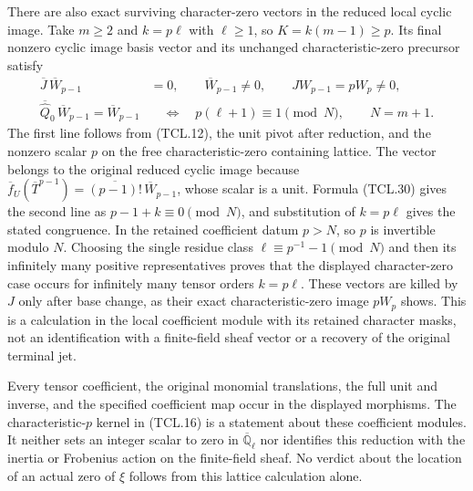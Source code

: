 There are also exact surviving character-zero vectors in the
reduced local cyclic image. Take \(m\geq2\) and \(k=p\ell\) with
\(\ell\geq1\), so \(K=k(m-1)\geq p\). Its final nonzero cyclic
image basis vector and its unchanged characteristic-zero precursor
satisfy
\[
 \begin{split}
 \overline J\,\overline W_{p-1}&=0,\qquad
       \overline W_{p-1}\ne0,\qquad J W_{p-1}=pW_p\ne0,\\
 \overline{\widehat Q}_0\,\overline W_{p-1}=\overline W_{p-1}
       &\quad\Longleftrightarrow\quad
       p(\ell+1)\equiv1\pmod{N},\qquad N=m+1 .
 \end{split}
 \tag{TCL.37}\label{eq:tcl-surviving-character}
\]
The first line follows from (TCL.12), the unit pivot after
reduction, and the nonzero scalar \(p\) on the free
characteristic-zero containing lattice. The vector belongs to
the original reduced cyclic image because
\(\overline f_U(\overline T^{p-1})
 =\overline{(p-1)!}\,\overline W_{p-1}\), whose scalar is a
unit. Formula (TCL.30) gives the second line as
\(p-1+k\equiv0\pmod N\), and substitution of \(k=p\ell\)
gives the stated congruence. In the retained coefficient datum
\(p>N\), so \(p\) is invertible modulo \(N\). Choosing the
single residue class
\(\ell\equiv p^{-1}-1\pmod N\) and then its infinitely many
positive representatives proves that the displayed character-zero
case occurs for infinitely many tensor orders \(k=p\ell\).
These vectors are killed by \(J\) only after base change, as
their exact characteristic-zero image \(pW_p\) shows. This is
a calculation in the local coefficient module with its retained
character masks, not an identification with a finite-field
sheaf vector or a recovery of the original terminal jet.

Every tensor coefficient, the original monomial translations, the
full unit and inverse, and the specified coefficient map occur in
the displayed morphisms. The characteristic-\(p\) kernel in
(TCL.16) is a statement about these coefficient modules. It neither
sets an integer scalar to zero in \(\overline{\mathbb Q}_\ell\)
nor identifies this reduction with the inertia or Frobenius action
on the finite-field sheaf. No verdict about the location of an
actual zero of \(\xi\) follows from this lattice calculation alone.
